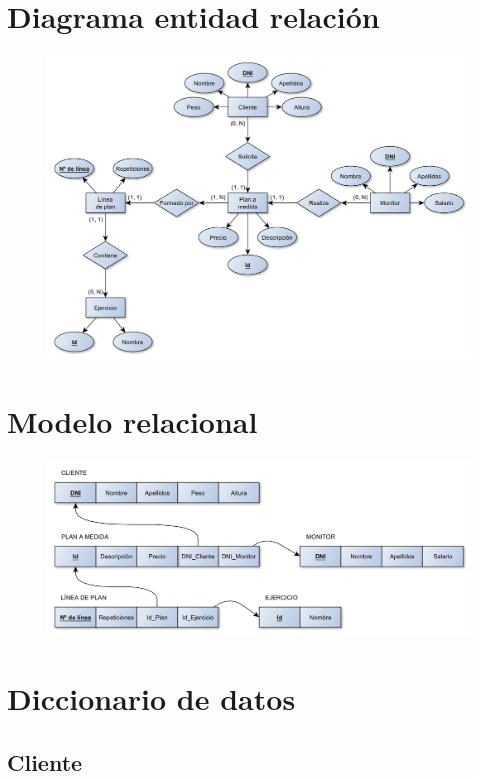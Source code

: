 \documentclass[12pt, a4paper]{article}
\begin{document}
	\section{Diagrama entidad relación}
		\begin{figure}[h]
			\centering
			\includegraphics[width=16cm]{Imagenes/entidad_relacion}
		\end{figure}
	
	\newpage
	\section{Modelo relacional}
	\begin{figure}[h]
		\centering
		\includegraphics[width=16cm]{Imagenes/modelo_relacional}
	\end{figure}
	
	\section{Diccionario de datos}
	
	\subsection{Cliente}
\end{document}
